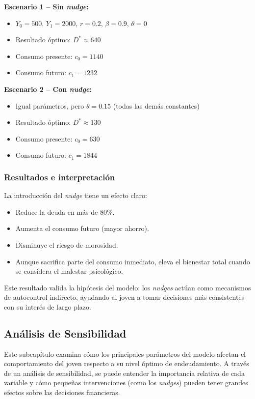 \documentclass[10pt]{article}
\begin{document}
\begin{multicols}{2}
\vspace{0.3cm}
\noindent\textbf{Escenario 1 – Sin \textit{nudge}:}
\begin{itemize}
    \item $Y_0 = 500$, $Y_1 = 2000$, $r = 0.2$, $\beta=0.9$, $\theta=0$
    \item Resultado óptimo: $D^* \approx 640$
    \item Consumo presente: $c_0 = 1140$
    \item Consumo futuro: $c_1 = 1232$
\end{itemize}

\vspace{0.2cm}
\noindent\textbf{Escenario 2 – Con \textit{nudge}:}
\begin{itemize}
    \item Igual parámetros, pero $\theta = 0.15$ (todas las demás constantes)
    \item Resultado óptimo: $D^* \approx 130$
    \item Consumo presente: $c_0 = 630$
    \item Consumo futuro: $c_1 = 1844$
\end{itemize}

\subsubsection*{Resultados e interpretación}

La introducción del \textit{nudge} tiene un efecto claro:
\begin{itemize}
    \item Reduce la deuda en más de 80\%.
    \item Aumenta el consumo futuro (mayor ahorro).
    \item Disminuye el riesgo de morosidad.
    \item Aunque sacrifica parte del consumo inmediato, eleva el bienestar total cuando se considera el malestar psicológico.
\end{itemize}

Este resultado valida la hipótesis del modelo: los \textit{nudges} actúan como mecanismos de autocontrol indirecto, ayudando al joven a tomar decisiones más consistentes con su interés de largo plazo.


\subsection{Análisis de Sensibilidad}

Este subcapítulo examina cómo los principales parámetros del modelo afectan el comportamiento del joven respecto a su nivel óptimo de endeudamiento. A través de un análisis de sensibilidad, se puede entender la importancia relativa de cada variable y cómo pequeñas intervenciones (como los \textit{nudges}) pueden tener grandes efectos sobre las decisiones financieras.


\end{multicols}
\end{document}
